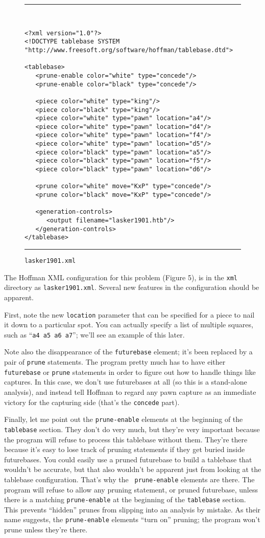 \documentclass[11pt]{article}
\begin{document}
\begin{figure}
\hrule\ 
{\small\begin{verbatim}
<?xml version="1.0"?>
<!DOCTYPE tablebase SYSTEM "http://www.freesoft.org/software/hoffman/tablebase.dtd">

<tablebase>
   <prune-enable color="white" type="concede"/>
   <prune-enable color="black" type="concede"/>

   <piece color="white" type="king"/>
   <piece color="black" type="king"/>
   <piece color="white" type="pawn" location="a4"/>
   <piece color="white" type="pawn" location="d4"/>
   <piece color="white" type="pawn" location="f4"/>
   <piece color="white" type="pawn" location="d5"/>
   <piece color="black" type="pawn" location="a5"/>
   <piece color="black" type="pawn" location="f5"/>
   <piece color="black" type="pawn" location="d6"/>

   <prune color="white" move="KxP" type="concede"/>
   <prune color="black" move="KxP" type="concede"/>

   <generation-controls>
      <output filename="lasker1901.htb"/>
   </generation-controls>
</tablebase>
\end{verbatim}}
\hrule
\caption{\tt lasker1901.xml}
\end{figure}

The Hoffman XML configuration for this problem (Figure 5), is in the
{\tt xml} directory as {\tt lasker1901.xml}.  Several new
features in the configuration should be apparent.

First, note the new {\tt location} parameter that can be specified for
a piece to nail it down to a particular spot.  You can actually
specify a list of multiple squares, such as ``{\tt a4 a5 a6 a7}'';
we'll see an example of this later.

Note also the disappearance of the {\tt futurebase} element; it's been
replaced by a pair of {\tt prune} statements.  The program pretty much
has to have either {\tt futurebase} or {\tt prune} statements in order
to figure out how to handle things like captures.  In this case, we
don't use futurebases at all (so this is a stand-alone analysis), and
instead tell Hoffman to regard any pawn capture as an immediate
victory for the capturing side (that's the {\tt concede} part).

Finally, let me point out the {\tt prune-enable} elements at the
beginning of the {\tt tablebase} section.  They don't do very much,
but they're very important because the program will refuse to process
this tablebase without them.  They're there because it's easy to lose
track of pruning statements if they get buried inside futurebases.
You could easily use a pruned futurebase to build a tablebase that
wouldn't be accurate, but that also wouldn't be apparent just from
looking at the tablebase configuration.  That's why the {\tt
prune-enable} elements are there.  The program will refuse to allow
any pruning statement, or pruned futurebase, unless there is a
matching {\tt prune-enable} at the beginning of the {\tt tablebase}
section.  This prevents ``hidden'' prunes from slipping into an
analysis by mistake.  As their name suggests, the {\tt prune-enable}
elements ``turn on'' pruning; the program won't prune unless they're there.
\end{document}
